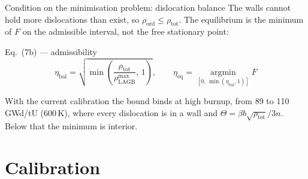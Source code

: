 \documentclass[10pt,aspectratio=169]{beamer}
\begin{document}
\begin{frame}{Condition on the minimisation problem: dislocation balance}
  The walls cannot hold more dislocations than exist, so
  $\rho_{\text{ord}} \leq \rho_{\text{tot}}$. The equilibrium is the minimum of $F$ on the
  \alert{admissible interval}, not the free stationary point:

  \begin{block}{Eq.~(7b) --- admissibility}
    \[
      \eta_{\text{bal}} = \sqrt{\min\!\left(\frac{\rho_{\text{tot}}}{\rho^{\max}_{\text{LAGB}}},\,1\right)},
      \qquad
      \eta_{\text{eq}} = \operatorname*{argmin}_{[0,\,\min(\eta_{\text{bal}},1)]} F
    \]
  \end{block}

  \small
  With the current calibration the bound \alert{binds at high burnup, from 89 to 110\,GWd/tU}
  (600\,K), where every dislocation is in a wall and $\Theta = \beta b\sqrt{\rho_{\text{tot}}}/3n$.
  Below that the minimum is interior.
\end{frame}
% 
\section{Calibration}
\end{document}
